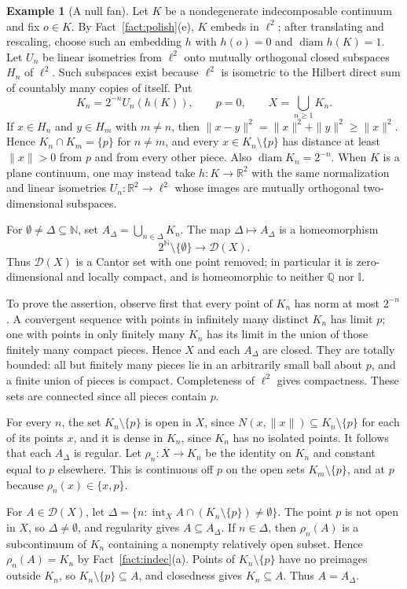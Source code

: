 \documentclass[11pt]{amsart}
\theoremstyle{definition}
\newtheorem{example}[theorem]{Example}
\theoremstyle{remark}
\newcommand{\intX}{\operatorname{int}_X}
\newcommand{\diam}{\operatorname{diam}}
\newcommand{\D}{\mathcal{D}}
\newcommand{\N}{\mathbb{N}}
\newcommand{\Q}{\mathbb{Q}}
\newcommand{\R}{\mathbb{R}}
\newcommand{\I}{\mathbb{I}}
\begin{document}
\begin{example}[A null fan]\label{ex:fan}
Let $K$ be a nondegenerate indecomposable continuum and fix $o\in K$. By Fact~\ref{fact:polish}(e), $K$ embeds in $\ell^2$; after translating and rescaling, choose such an embedding $h$ with $h(o)=0$ and $\diam h(K)=1$. Let $U_n$ be linear isometries from $\ell^2$ onto mutually orthogonal closed subspaces $H_n$ of $\ell^2$. Such subspaces exist because $\ell^2$ is isometric to the Hilbert direct sum of countably many copies of itself. Put
\[
K_n=2^{-n}U_n(h(K)),\qquad p=0,\qquad X=\bigcup_{n\ge1}K_n.
\]
If $x\in H_n$ and $y\in H_m$ with $m\neq n$, then $\|x-y\|^2=\|x\|^2+\|y\|^2\ge\|x\|^2$. Hence $K_n\cap K_m=\{p\}$ for $n\neq m$, and every $x\in K_n\setminus\{p\}$ has distance at least $\|x\|>0$ from $p$ and from every other piece. Also $\diam K_n=2^{-n}$. When $K$ is a plane continuum, one may instead take $h\colon K\to\R^2$ with the same normalization and linear isometries $U_n\colon\R^2\to\ell^2$ whose images are mutually orthogonal two-dimensional subspaces.

For $\emptyset\neq\Delta\subseteq\N$, set $A_\Delta=\bigcup_{n\in\Delta}K_n$. The map $\Delta\mapsto A_\Delta$ is a homeomorphism
\[
2^\N\setminus\{\emptyset\}\longrightarrow\D(X).
\]
Thus $\D(X)$ is a Cantor set with one point removed; in particular it is zero-dimensional and locally compact, and is homeomorphic to neither $\Q$ nor $\I$.

To prove the assertion, observe first that every point of $K_n$ has norm at most $2^{-n}$. A convergent sequence with points in infinitely many distinct $K_n$ has limit $p$; one with points in only finitely many $K_n$ has its limit in the union of those finitely many compact pieces. Hence $X$ and each $A_\Delta$ are closed. They are totally bounded: all but finitely many pieces lie in an arbitrarily small ball about $p$, and a finite union of pieces is compact. Completeness of $\ell^2$ gives compactness. These sets are connected since all pieces contain $p$.

For every $n$, the set $K_n\setminus\{p\}$ is open in $X$, since $N(x,\|x\|)\subseteq K_n\setminus\{p\}$ for each of its points $x$, and it is dense in $K_n$, since $K_n$ has no isolated points. It follows that each $A_\Delta$ is regular. Let $\rho_n\colon X\to K_n$ be the identity on $K_n$ and constant equal to $p$ elsewhere. This is continuous off $p$ on the open sets $K_m\setminus\{p\}$, and at $p$ because $\rho_n(x)\in\{x,p\}$.

For $A\in\D(X)$, let $\Delta=\{n:\intX A\cap(K_n\setminus\{p\})\neq\emptyset\}$. The point $p$ is not open in $X$, so $\Delta\neq\emptyset$, and regularity gives $A\subseteq A_\Delta$. If $n\in\Delta$, then $\rho_n(A)$ is a subcontinuum of $K_n$ containing a nonempty relatively open subset. Hence $\rho_n(A)=K_n$ by Fact~\ref{fact:indec}(a). Points of $K_n\setminus\{p\}$ have no preimages outside $K_n$, so $K_n\setminus\{p\}\subseteq A$, and closedness gives $K_n\subseteq A$. Thus $A=A_\Delta$.


\end{example}
\end{document}
